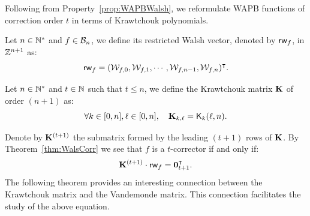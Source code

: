 \documentclass[11pt]{llncs}
\begin{document}



%

Following from Property~\ref{prop:WAPBWalsh}, we reformulate WAPB functions of correction order $t$ in terms of Krawtchouk polynomials.

\begin{definition}\label{def:restWalshVect}
	Let $n\in \mathbb{N}^*$ and $f\in \mathcal{B}_n$, we define its restricted Walsh vector, denoted by $\mathsf{rw}_{f}$, in $\mathbb{Z}^{n+1}$ as:
	\[\mathsf{rw}_{f}=(\mathcal{W}_{f,0},\mathcal{W}_{f,1},\cdots,\mathcal{W}_{f,n-1},\mathcal{W}_{f,n})^\intercal.\]

\end{definition}


\begin{definition}\label{def:KrMat}
	Let $n\in \mathbb{N}^*$ and $t\in \mathbb{N}$ such that $t\le n$, we define the Krawtchouk matrix $\mathbf{K}$ of order $(n+1)$ as:
	\[\forall k \in [0,n], \ell \in [0,n], \quad \mathbf{K}_{k,\ell}=\mathsf{K}_{k}(\ell,n).\]


\end{definition}

Denote by $\mathbf{K}^{(t+1)}$ the submatrix formed by the leading $(t+1)$ rows of $\mathbf{K}$.
By Theorem~\ref{thm:WalsCorr} we see that $f$ is a $t$-corrector if and only if:
\begin{equation}\label{Eq_t-corrector}
\mathbf{K}^{(t+1)}\cdot \mathsf{rw}_{f}=\textbf{0}_{t+1}^\intercal.
\end{equation}
The following theorem provides an interesting connection between the Krawtchouk matrix and the Vandemonde matrix. This connection facilitates the study of the above equation.

\end{document}
